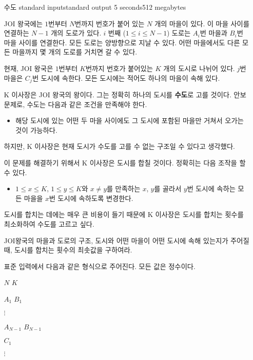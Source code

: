 \begin{problem}{수도}
	{standard input}{standard output}
	{5 seconds}{512 megabytes}{}
	
	JOI 왕국에는 $1$번부터 $N$번까지 번호가 붙어 있는 $N$ 개의 마을이 있다. 이 마을 사이를 연결하는 $N-1$ 개의 도로가 있다. $i$ 번째 ($1 \le i \le N-1$) 도로는 $A_i$번 마을과 $B_i$번 마을 사이를 연결한다. 모든 도로는 양방향으로 지날 수 있다. 어떤 마을에서도 다른 모든 마을까지 몇 개의 도로를 거치면 갈 수 있다.
	
	현재, JOI 왕국은 $1$번부터 $K$번까지 번호가 붙어있는 $K$ 개의 도시로 나뉘어 있다. $j$번 마을은 $C_j$번 도시에 속한다. 모든 도시에는 적어도 하나의 마을이 속해 있다.
	
	K 이사장은 JOI 왕국의 왕이다. 그는 정확히 하나의 도시를 \textbf{수도}로 고를 것이다. 안보 문제로, 수도는 다음과 같은 조건을 만족해야 한다.
	
	\begin{itemize}
		\item[] 해당 도시에 있는 어떤 두 마을 사이에도 그 도시에 포함된 마을만 거쳐서 오가는 것이 가능하다.
	\end{itemize}

	하지만, K 이사장은 현재 도시가 수도를 고를 수 없는 구조일 수 있다고 생각했다.
	
	이 문제를 해결하기 위해서 K 이사장은 도시를 합칠 것이다. 정확히는 다음 조작을 할 수 있다.
	
	\begin{itemize}
		\item[] $1 \le x \le K$, $1 \le y \le K$와 $x \ne y$를 만족하는 $x$, $y$를 골라서 $y$번 도시에 속하는 모든 마을을 $x$번 도시에 속하도록 변경한다.
	\end{itemize}

	도시를 합치는 데에는 매우 큰 비용이 들기 때문에 K 이사장은 도시를 합치는 횟수를 최소화하여 수도를 고르고 싶다.
	
	JOI왕국의 마을과 도로의 구조, 도시와 어떤 마을이 어떤 도시에 속해 있는지가 주어질 때, 도시를 합치는 횟수의 최솟값을 구하여라.
	
	\InputFile
	
	표준 입력에서 다음과 같은 형식으로 주어진다. 모든 값은 정수이다.

	$N$ $K$
	
	$A_1$ $B_1$
	
	$\vdots$
	
	$A_{N-1}$ $B_{N-1}$
	
	$C_1$
	
	$\vdots$
	

\end{problem}
